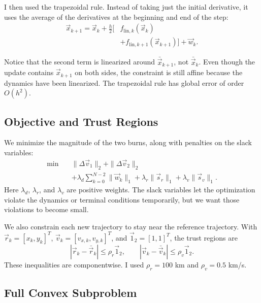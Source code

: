\documentclass{article}
\begin{document}
I then used the trapezoidal rule. Instead of taking just the initial derivative, it uses the average of the derivatives at the beginning and end of the step:
\[
\boxed{
\begin{aligned}
\vec{x}_{k+1}=\vec{x}_k+\frac{h}{2}\bigl[
&f_{\mathrm{lin},k}(\vec{x}_k)\\
&+f_{\mathrm{lin},k+1}(\vec{x}_{k+1})\bigr]+\vec{w}_k.
\end{aligned}
}
\]

Notice that the second term is linearized around $\bar{\vec{x}}_{k+1}$, not $\bar{\vec{x}}_k$. Even though the update contains $\vec{x}_{k+1}$ on both sides, the constraint is still affine because the dynamics have been linearized. The trapezoidal rule has global error of order $O(h^2)$.

\subsection{Objective and Trust Regions}

We minimize the magnitude of the two burns, along with penalties on the slack variables:
\[
\boxed{
\begin{aligned}
\min\quad &\|\Delta\vec{v}_1\|_2+\|\Delta\vec{v}_2\|_2\\
&+\lambda_d\sum_{k=0}^{N-2}\|\vec{w}_k\|_1
+\lambda_r\|\vec{s}_r\|_1
+\lambda_v\|\vec{s}_v\|_1.
\end{aligned}
}
\]
Here $\lambda_d$, $\lambda_r$, and $\lambda_v$ are positive weights. The slack variables let the optimization violate the dynamics or terminal conditions temporarily, but we want those violations to become small.

We also constrain each new trajectory to stay near the reference trajectory. With $\vec{r}_k=[x_k,y_k]^T$, $\vec{v}_k=[v_{x,k},v_{y,k}]^T$, and $\vec{1}_2=[1,1]^T$, the trust regions are
\[
|\vec{r}_k-\bar{\vec{r}}_k|\le\rho_r\vec{1}_2,
\qquad
|\vec{v}_k-\bar{\vec{v}}_k|\le\rho_v\vec{1}_2.
\]
These inequalities are componentwise. I used $\rho_r=100$ km and $\rho_v=0.5$ km/s.

\subsection{Full Convex Subproblem}
\end{document}

